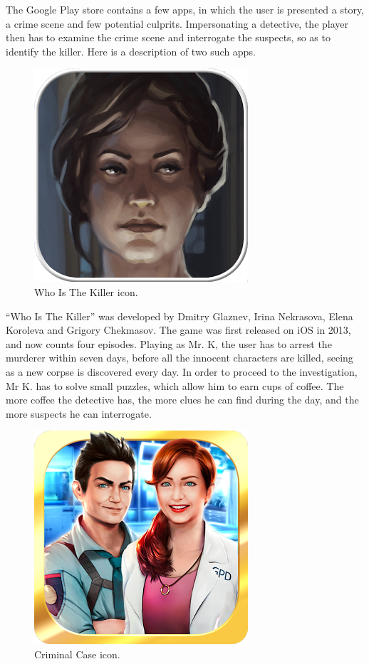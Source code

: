 \documentclass{mproj}
\begin{document}
The Google Play store contains a few apps, in which the user is presented a story, a crime scene and few potential culprits. Impersonating a detective, the player then has to examine the crime scene and interrogate the suspects, so as to identify the killer. Here is a description of two such apps. \par

\begin{figure}
	\vspace{-10pt}
	\centering
	\includegraphics[scale=0.25]{images/whoisthekiller_icon}
	\caption{Who Is The Killer icon.}
	\vspace{-25pt}
\end{figure}

``Who Is The Killer'' \cite{whoisthekiller} was developed by Dmitry Glaznev, Irina Nekrasova, Elena Koroleva and Grigory Chekmasov. The game was first released on iOS in 2013, and now counts four episodes. Playing as Mr. K, the user has to arrest the murderer within seven days, before all the innocent characters are killed, seeing as a new corpse is discovered every day. In order to proceed to the investigation, Mr K. has to solve small puzzles, which allow him to earn cups of coffee. The more coffee the detective has, the more clues he can find during the day, and the more suspects he can interrogate. \par

\begin{figure}
	\vspace{-10pt}
	\centering
	\includegraphics[scale=0.25]{images/criminalcase_icon}
	\caption{Criminal Case icon.}
	\vspace{-30pt}
\end{figure}
\end{document}
